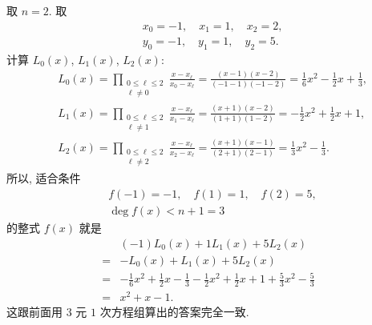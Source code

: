\begin{example}
    取 $n = 2$. 取
    \begin{align*}
         & x_0 = -1, \quad x_1 = 1, \quad x_2 = 2, \\
         & y_0 = -1, \quad y_1 = 1, \quad y_2 = 5.
    \end{align*}
    计算 $L_0 (x)$, $L_1 (x)$, $L_2 (x)$:
    \begin{align*}
         & L_0 (x) = \prod_{\begin{smallmatrix}0 \leq \ell \leq 2 \\\ell \neq 0\end{smallmatrix}} \frac{x - x_\ell}{x_0 - x_\ell} = \frac{(x - 1)(x - 2)}{(-1 - 1)(-1 - 2)} = \frac16 x^2 - \frac12 x + \frac13, \\
         & L_1 (x) = \prod_{\begin{smallmatrix}0 \leq \ell \leq 2 \\\ell \neq 1\end{smallmatrix}} \frac{x - x_\ell}{x_1 - x_\ell} = \frac{(x + 1)(x - 2)}{(1 + 1)(1 - 2)} = -\frac12 x^2 + \frac12 x + 1,        \\
         & L_2 (x) = \prod_{\begin{smallmatrix}0 \leq \ell \leq 2 \\\ell \neq 2\end{smallmatrix}} \frac{x - x_\ell}{x_2 - x_\ell} = \frac{(x + 1)(x - 1)}{(2 + 1)(2 - 1)} = \frac13 x^2 - \frac13.
    \end{align*}
    所以, 适合条件
    \begin{align*}
         & f(-1) = -1, \quad f(1) = 1, \quad f(2) = 5, \\
         & \deg f(x) < n + 1 = 3
    \end{align*}
    的整式 $f(x)$ 就是
    \begin{align*}
             & (-1)L_0 (x) + 1L_1 (x) + 5L_2 (x)  \\
        = {} & -L_0 (x) + L_1 (x) + 5L_2 (x)      \\
        = {} & -\frac16 x^2 + \frac12 x - \frac13
        - \frac12 x^2 + \frac12 x + 1
        + \frac53 x^2 - \frac53                   \\
        = {} & x^2 + x - 1.
    \end{align*}
    这跟前面用 $3$ 元 $1$ 次方程组算出的答案完全一致.
\end{example}

